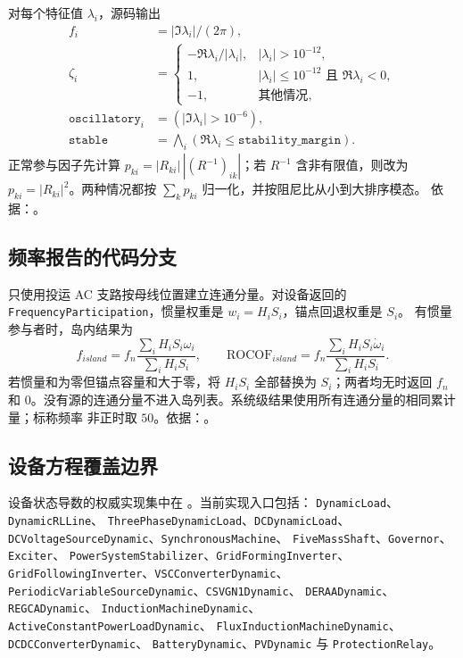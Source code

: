 对每个特征值 $\lambda_i$，源码输出
\begin{align}
 f_i&=|\Im\lambda_i|/(2\pi),\\
 \zeta_i&=\begin{cases}-\Re\lambda_i/|\lambda_i|,&|\lambda_i|>10^{-12},\\
 1,&|\lambda_i|\leq10^{-12}\text{ 且 }\Re\lambda_i<0,\\
 -1,&\text{其他情况},\end{cases}\\
 \texttt{oscillatory}_i&=(|\Im\lambda_i|>10^{-6}),\\
 \texttt{stable}&=\bigwedge_i(\Re\lambda_i\leq\texttt{stability\_margin}).
\end{align}
正常参与因子先计算 $p_{ki}=|R_{ki}|\,|(R^{-1})_{ik}|$；若 $R^{-1}$ 含非有限值，则改为
$p_{ki}=|R_{ki}|^2$。两种情况都按 $\sum_kp_{ki}$ 归一化，并按阻尼比从小到大排序模态。
依据：。

\subsection{频率报告的代码分支}
只使用投运 AC 支路按母线位置建立连通分量。对设备返回的
\texttt{FrequencyParticipation}，惯量权重是 $w_i=H_iS_i$，锚点回退权重是 $S_i$。
有惯量参与者时，岛内结果为
\begin{equation}
 f_{island}=f_n\frac{\sum_iH_iS_i\omega_i}{\sum_iH_iS_i},\qquad
 \mathrm{ROCOF}_{island}=f_n\frac{\sum_iH_iS_i\dot\omega_i}{\sum_iH_iS_i}.
\end{equation}
若惯量和为零但锚点容量和大于零，将 $H_iS_i$ 全部替换为 $S_i$；两者均无时返回
$f_n$ 和 $0$。没有源的连通分量不进入岛列表。系统级结果使用所有连通分量的相同累计量；标称频率
非正时取 $50$。依据：。

\subsection{设备方程覆盖边界}
设备状态导数的权威实现集中在
。当前实现入口包括：
\texttt{DynamicLoad}、\texttt{DynamicRLLine}、
\texttt{ThreePhaseDynamicLoad}、\texttt{DCDynamicLoad}、
\texttt{DCVoltageSourceDynamic}、\texttt{SynchronousMachine}、
\texttt{FiveMassShaft}、\texttt{Governor}、\texttt{Exciter}、
\texttt{PowerSystemStabilizer}、\texttt{GridFormingInverter}、
\texttt{GridFollowingInverter}、\texttt{VSCConverterDynamic}、
\texttt{PeriodicVariableSourceDynamic}、\texttt{CSVGN1Dynamic}、
\texttt{DERAADynamic}、\texttt{REGCADynamic}、
\texttt{InductionMachineDynamic}、\texttt{ActiveConstantPowerLoadDynamic}、
\texttt{FluxInductionMachineDynamic}、\texttt{DCDCConverterDynamic}、
\texttt{BatteryDynamic}、\texttt{PVDynamic} 与
\texttt{ProtectionRelay}。

